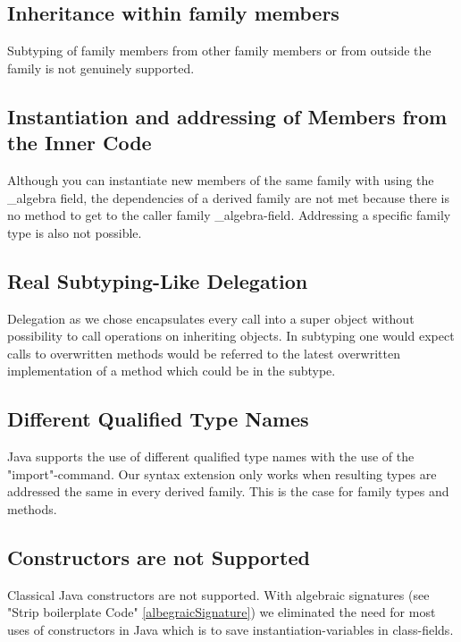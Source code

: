 \documentclass{report}
\begin{document}
\subsection{Inheritance within family members}

Subtyping of family members from other family members or from outside the family is not genuinely supported.

\subsection{Instantiation and addressing of Members from the Inner Code}

Although you can instantiate new members of the same family with using the \_algebra field, the dependencies of a derived family are not met because there is no method to get to the caller family \_algebra-field.
Addressing a specific family type is also not possible.

\subsection{Real Subtyping-Like Delegation}

Delegation as we chose encapsulates every call into a super object without possibility to call operations on inheriting objects. In subtyping one would expect calls to overwritten methods would be referred to the latest overwritten implementation of a method which could be in the subtype.

\subsection{Different Qualified Type Names}

Java supports the use of different qualified type names with the use of the "import"-command. Our syntax extension only works when resulting types are addressed the same in every derived family. This is the case for family types and methods.

\subsection{Constructors are not Supported}

Classical Java constructors are not supported. With algebraic signatures (see "Strip boilerplate Code" \ref{albegraicSignature}) we eliminated the need for most uses of constructors in Java which is to save instantiation-variables in class-fields.
\end{document}
